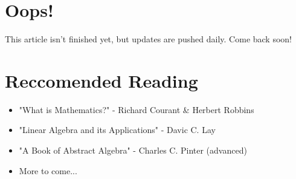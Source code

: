 \documentclass[a4paper,12pt]{article}
\begin{document}
\section{Oops!}
This article isn't finished yet, but updates are pushed daily. Come back soon!

\section{Reccomended Reading}
\begin{itemize}
\item "What is Mathematics?" - Richard Courant \& Herbert Robbins
\item "Linear Algebra and its Applications" - Davic C. Lay
\item "A Book of Abstract Algebra" - Charles C. Pinter (advanced)
\item More to come...
\end{itemize}
\end{document}
